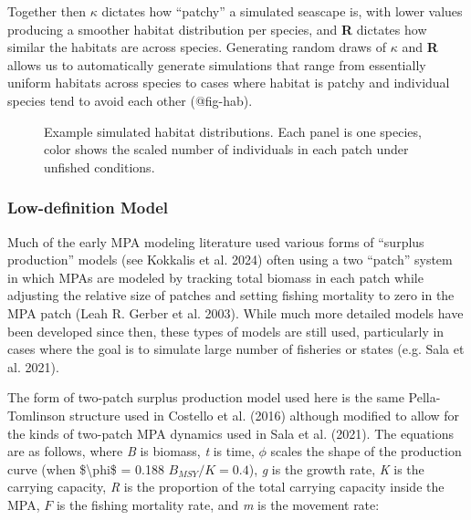 \documentclass[
  default,
  lineno,
  referee]{sn-jnl}
\begin{document}
Together then \(\kappa\) dictates how ``patchy'' a simulated seascape
is, with lower values producing a smoother habitat distribution per
species, and \textbf{R} dictates how similar the habitats are across
species. Generating random draws of \(\kappa\) and \textbf{R} allows us
to automatically generate simulations that range from essentially
uniform habitats across species to cases where habitat is patchy and
individual species tend to avoid each other (@fig-hab).

\begin{figure}


\caption{\label{fig-hab}Example simulated habitat distributions. Each
panel is one species, color shows the scaled number of individuals in
each patch under unfished conditions.}

\end{figure}%

\subsubsection{Low-definition Model}\label{low-definition-model}

Much of the early MPA modeling literature used various forms of
``surplus production'' models (see Kokkalis et al. 2024) often using a
two ``patch'' system in which MPAs are modeled by tracking total biomass
in each patch while adjusting the relative size of patches and setting
fishing mortality to zero in the MPA patch (Leah R. Gerber et al. 2003).
While much more detailed models have been developed since then, these
types of models are still used, particularly in cases where the goal is
to simulate large number of fisheries or states (e.g. Sala et al. 2021).

The form of two-patch surplus production model used here is the same
Pella-Tomlinson structure used in Costello et al. (2016) although
modified to allow for the kinds of two-patch MPA dynamics used in Sala
et al. (2021). The equations are as follows, where \emph{B} is biomass,
\emph{t} is time, \(\phi\) scales the shape of the production curve
(when \$\textbackslash phi\$ = 0.188 \(B_{MSY}/K = 0.4\)), \emph{g} is
the growth rate, \emph{K} is the carrying capacity, \emph{R} is the
proportion of the total carrying capacity inside the MPA, \(F\) is the
fishing mortality rate, and \emph{m} is the movement rate:
\end{document}
